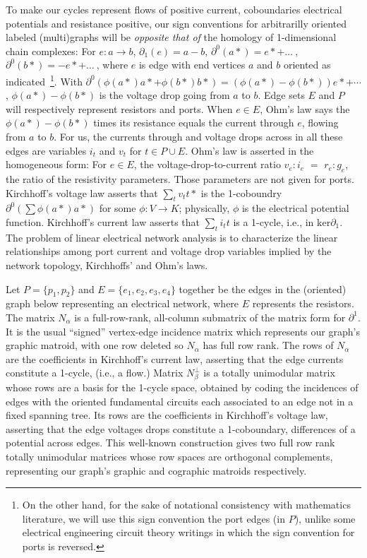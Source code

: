 

To make our cycles represent flows of positive current,
coboundaries electrical potentials and resistance positive,
our sign conventions for arbitrarilly oriented labeled (multi)graphs
will be \emph{opposite that of} the homology of 1-dimensional chain complexes:
For $e : a \rightarrow b$, $\partial_1(e)=a-b$, $\partial^0(a*)=e*+ \ldots\  $,
$\partial^0(b*)=-e*+ \ldots\  $, where $e$ is edge with end vertices $a$ and $b$ oriented
as indicated\
\footnote{
On the other hand, for the sake of notational consistency with mathematics
literature, we will use this sign convention the port edges (in $P$), unlike some electrical engineering
circuit theory writings in which the sign convention for ports is reversed.}.
With $\partial^0(\phi(a*) a* + \phi(b*) b*) = (\phi(a*)-\phi(b*))e* + \cdots$,
$\phi(a*)-\phi(b*)$ is the voltage drop going from $a$ to $b$.
Edge sets $E$ and $P$ will respectively represent resistors and ports.
When $e\in E$,
Ohm's law says the
$\phi(a*)-\phi(b*)$ times its resistance equals the current through $e$, flowing from $a$ to $b$.
For us, the currents through and voltage drops across
in all these edges are variables $i_t$ and $v_t$ for $t\in P\cup E$.  Ohm's law
is asserted in the homogeneous form:  For $e\in E$, the voltage-drop-to-current ratio
$v_e:i_e$ $=$ $r_e:g_e$, the ratio of the resistivity parameters.
Those parameters are not given for ports.
Kirchhoff's voltage law asserts that $\sum_tv_tt*$ is the 1-coboundry $\partial^0(\sum \phi(a*)a*)$
for some $\phi:V\rightarrow K$; physically, $\phi$ is the electrical potential function.
Kirchhoff's current law asserts that $\sum_ti_t t$ is a 1-cycle, i.e., in $\text{ker}\partial_1$. 
The problem of linear electrical network analysis is to characterize
the linear relationships among port current and voltage drop variables implied by
the network topology, Kirchhoffs' and Ohm's laws.  


Let $P=\{p_1, p_2\}$ and $E=\{e_1, e_2, e_3, e_4\}$ together be the edges in the (oriented) graph
below representing an electrical network, where $E$ represents the resistors.   The matrix $N_\alpha$ is
a full-row-rank, all-column submatrix of the matrix form for $\partial^1$.  It is the
usual ``signed'' vertex-edge incidence matrix which represents our graph's graphic matroid, with one
row deleted so $N_\alpha$ has full row rank.  The rows of $N_\alpha$ are the coefficients in
Kirchhoff's current law, asserting that the edge currents constitute a 1-cycle, (i.e., a flow.)
Matrix $N_\beta^\perp$ is a totally unimodular matrix whose
rows are a basis for the 1-cycle space, obtained by coding the incidences of edges with the oriented fundamental
circuits each associated to an edge not in a fixed spanning tree.  Its rows are the coefficients in
Kirchhoff's voltage law, asserting that the edge
voltages drops constitute a 1-coboundary, differences
of a potential across edges.
This well-known construction gives
two full row rank totally unimodular matrices whose row spaces are orthogonal complements,
representing our graph's
graphic and cographic matroids respectively.

